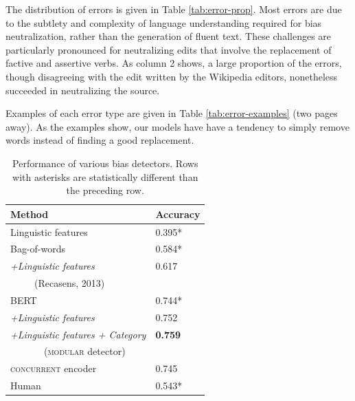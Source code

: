 The distribution of errors is given in Table \ref{tab:error-prop}. Most errors are due to the subtlety and complexity of language understanding required for bias neutralization, rather than the generation of fluent text. These challenges are particularly pronounced for neutralizing edits that involve the replacement of factive and assertive verbs. As column 2 shows, a large proportion of the errors, though disagreeing with the edit written by the Wikipedia editors, nonetheless succeeded in neutralizing the source. 


Examples of each error type are given in Table \ref{tab:error-examples} (two pages away). As the examples show, our models have have a tendency to simply remove words instead of finding a good replacement.

\begin{table}[htb]
\centering
\begin{tabular}{l|l}
\textbf{Method}                       & \textbf{Accuracy}  \\ \hline \hline
Linguistic features              &    0.395*        \\ \hline
Bag-of-words                        &   0.584*          \\
\it{+Linguistic features}      &   0.617          \\ 
\ \ \ \ \ (Recasens, 2013)      &              \\ \hline
BERT                         &     0.744*     \\
\it{ +Linguistic features} &     0.752     \\ 
\it{ +Linguistic features + Category} &    \textbf{0.759}         \\ 
\ \ \ \ \ \ \ (\textsc{modular} detector) &             \\ \hline
\textsc{concurrent} encoder &    0.745    \\ \hline
Human                        &     0.543*         \\ %
\end{tabular}
\caption{Performance of various bias detectors. Rows with asterisks are statistically different than the preceding row.}
\label{tab:tagging}
\end{table}




